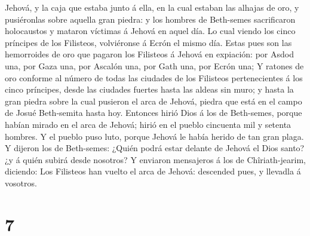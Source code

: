 Jehová, y la caja que estaba junto á ella, en la cual estaban las
alhajas de oro, y pusiéronlas sobre aquella gran piedra: y los hombres
de Beth-semes sacrificaron holocaustos y mataron víctimas á Jehová en
aquel día.  Lo cual viendo los cinco príncipes de los
Filisteos, volviéronse á Ecrón el mismo día.  Estas pues
son las hemorroides de oro que pagaron los Filisteos á Jehová en
expiación: por Asdod una, por Gaza una, por Ascalón una, por Gath una,
por Ecrón una;  Y ratones de oro conforme al número de
todas las ciudades de los Filisteos pertenecientes á los cinco
príncipes, desde las ciudades fuertes hasta las aldeas sin muro; y hasta
la gran piedra sobre la cual pusieron el arca de Jehová, piedra que está
en el campo de Josué Beth-semita hasta hoy.  Entonces hirió
Dios á los de Beth-semes, porque habían mirado en el arca de Jehová;
hirió en el pueblo cincuenta mil y setenta hombres. Y el pueblo puso
luto, porque Jehová le había herido de tan gran plaga.  Y
dijeron los de Beth-semes: ¿Quién podrá estar delante de Jehová el Dios
santo? ¿y á quién subirá desde nosotros?  Y enviaron
mensajeros á los de Chîriath-jearim, diciendo: Los Filisteos han vuelto
el arca de Jehová: descended pues, y llevadla á vosotros.

\hypertarget{section-6}{%
\section{7}\label{section-6}}

